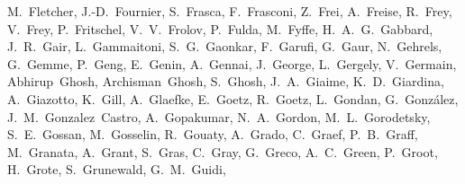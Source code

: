 {M.~Fletcher,  %
J.-D.~Fournier, %
S.~Frasca, %
F.~Frasconi, %
Z.~Frei,  %
A.~Freise,  %
R.~Frey,  %
V.~Frey, %
P.~Fritschel,  %
V.~V.~Frolov,  %
P.~Fulda,  %
M.~Fyffe,  %
H.~A.~G.~Gabbard,  %
J.~R.~Gair,  %
L.~Gammaitoni, %
S.~G.~Gaonkar,  %
F.~Garufi, %
G.~Gaur,  %
N.~Gehrels,  %
G.~Gemme, %
P.~Geng,  %
E.~Genin, %
A.~Gennai, %
J.~George,  %
L.~Gergely,  %
V.~Germain, %
Abhirup~Ghosh,  %
Archisman~Ghosh,  %
S.~Ghosh, %
J.~A.~Giaime,  %
K.~D.~Giardina,  %
A.~Giazotto, %
K.~Gill,  %
A.~Glaefke,  %
E.~Goetz,  %
R.~Goetz,  %
L.~Gondan,  %
G.~Gonz\'alez,  %
J.~M.~Gonzalez~Castro, %
A.~Gopakumar,  %
N.~A.~Gordon,  %
M.~L.~Gorodetsky,  %
S.~E.~Gossan,  %
M.~Gosselin, %
R.~Gouaty, %
A.~Grado, %
C.~Graef,  %
P.~B.~Graff,  %
M.~Granata, %
A.~Grant,  %
S.~Gras,  %
C.~Gray,  %
G.~Greco, %
A.~C.~Green,  %
P.~Groot, %
H.~Grote,  %
S.~Grunewald,  %
G.~M.~Guidi, %
}

